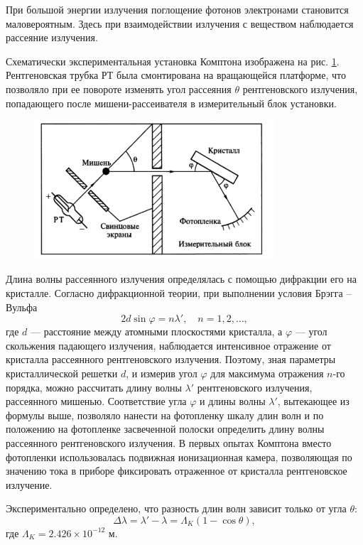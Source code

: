При большой энергии излучения поглощение фотонов электронами становится
маловероятным. Здесь при взаимодействии излучения с веществом наблюдается
рассеяние излучения.

Схематически экспериментальная установка Комптона 
изображена на рис. \ref{fig:kompton}. Рентгеновская трубка РТ была смонтирована
на вращающейся платформе, что позволяло при ее повороте 
изменять угол рассеяния $ \theta $ рентгеновского излучения, попадающего
после мишени-рассеивателя в измерительный блок установки.

\begin{figure}[h]
  \centering
  \includegraphics[width=0.8\textwidth]{img/oral-05/kompton}
  \label{fig:kompton}
\end{figure}

Длина волны рассеянного излучения определялась с помощью
дифракции его на кристалле. Согласно дифракционной теории,
при выполнении условия Брэгга -- Вульфа 
\[
    2d\sin\varphi = n\lambda', \quad n = 1,2, \ldots,
\]
где $ d $ --- расстояние между атомными плоскостями кристалла, а $ \varphi $ ---
угол скольжения падающего излучения, наблюдается 
интенсивное отражение от кристалла рассеянного рентгеновского излучения.
Поэтому, зная параметры кристаллической решетки $ d $, и измерив
угол $ \varphi $ для максимума отражения $ n $-го порядка, можно рассчитать
длину волны $ \lambda' $ рентгеновского излучения, рассеянного мишенью.
Соответствие угла $ \varphi $ и длины волны $ \lambda' $, вытекающее из формулы
выше, 
позволяло нанести на фотопленку шкалу длин волн и по положению
на фотопленке засвеченной полоски определить длину волны 
рассеянного рентгеновского излучения. В первых опытах Комптона 
вместо фотопленки использовалась подвижная ионизационная камера,
позволяющая по значению тока в приборе фиксировать отраженное
от кристалла рентгеновское излучение.

Экспериментально определено, что разность длин волн зависит только от угла $
\theta $: 
\[
    \Delta \lambda = \lambda' - \lambda = \Lambda_K (1-\cos\theta),
\]
где $ \Lambda_K = 2.426\times10^{-12} $ м.


